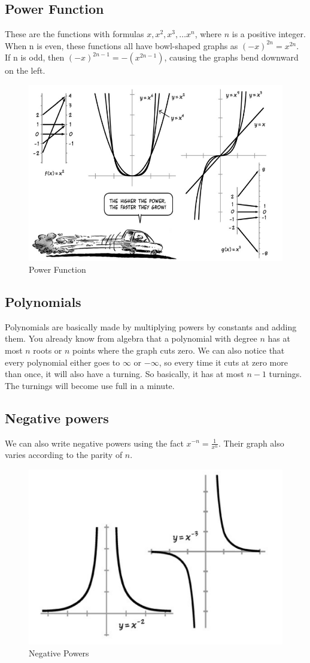 \subsection{Power Function}
These are the functions with formulas $x, x^2, x^3, \dots x^n$, where $n$ is a positive integer. When n is even, these functions all have bowl-shaped graphs as $(-x)^{2n} = x^{2n}$.\\ If n is odd, then $(-x)^{2n-1} = -(x^{2n-1})$, causing the graphs bend downward on the left.
\begin{figure} [h]
    \centering
    \includegraphics[width=0.5\linewidth]{Photos/Power Function.png}
    \caption{Power Function}
    
\end{figure}
\subsection{Polynomials}
Polynomials are basically made by multiplying powers by constants and adding them. You already know from algebra that a polynomial with degree $n$ has at most $n$ roots or $n$ points where the graph cuts zero. We can also notice that every polynomial either goes to $\infty$ or $-\infty$, so every time it cuts at zero more than once, it will also have a turning. So basically,  it has at most $n-1$ turnings. The turnings will become use full in a minute.
\subsection{Negative powers}
We can also write negative powers using the fact $x^{-n}=\frac{1}{x^n}$. Their graph also varies according to the parity of $n$.\\
\begin{figure} [h]
    \centering
    \includegraphics[width=0.5\linewidth]{Photos/Negative powers.png}
    \caption{Negative Powers}
    
\end{figure}
